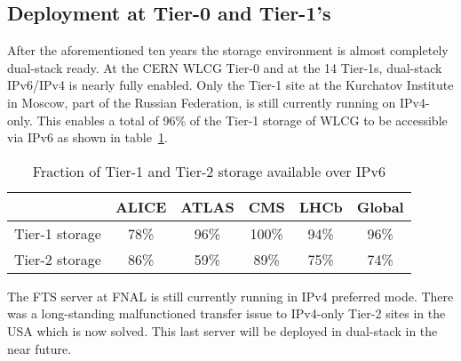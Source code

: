 
%
\subsection{Deployment at Tier-0 and Tier-1's}
After the aforementioned ten years the storage environment is almost completely dual-stack ready. At the CERN WLCG Tier-0 and at the 14 Tier-1s, dual-stack IPv6/IPv4 is nearly fully enabled. Only the Tier-1 site at the Kurchatov Institute in Moscow, part of the Russian Federation, is still currently running on IPv4-only. This enables a total of 96\% of the Tier-1 storage of WLCG to be accessible via IPv6 as shown in table~\ref{tab:t012stor}.
\begin{table}[h]
\centering
\caption{Fraction of Tier-1 and Tier-2 storage available over IPv6}
\label{tab:t012stor}
\begin{tabular}{lccccc}
\hline
& ALICE & ATLAS & CMS & LHCb & Global \\\hline
Tier-1 storage & 78\% & 96\% & 100\% & 94\% & 96\% \\
Tier-2 storage & 86\% & 59\% &  89\% & 75\% & 74\% \\\hline
\end{tabular}
\end{table}

The FTS server at FNAL is still currently running in IPv4 preferred mode. There was a long-standing malfunctioned transfer issue to IPv4-only Tier-2 sites in the USA which is now solved. This last server will be deployed in dual-stack in the near future.
